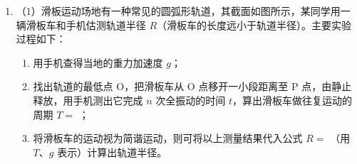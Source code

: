 \documentclass[\gkver]{gaokaozhenti}
\begin{document}
\begin{enumerate}
{B．根据右手定则可知，金属棒 a 第一次穿过磁场时回路中有逆时针方向的感应电流，故 B 正确；

C．电路中产生的平均电动势为 $\overline{E}=\frac{\Delta\Phi}{\Delta t}=\frac{BLd}{\Delta t}$，平均电流为 $\overline{I}=\frac{\overline{E}}{2R}$，金属棒 a 受到的安培力为 $\overline{F}=B\overline{I}d$。规定向右为正方向，对金属棒 a，根据动量定理得 $-B\overline{I}d\cdot\Delta t=m_{a}v_{a}-m_{a}v_{0}$，解得金属棒第一次离开磁场时速度 $v_{a}=1.5\Ums$。金属棒 a 第一次穿过磁场区域的过程中，电路中产生的总热量等于金属棒 a 机械能的减少量，即 $Q=\frac{1}{2}m_{a}v_{0}^{2}-\frac{1}{2}m_{a}v_{a}^{2}$，联立并代入数据得 $Q=0.6875\UJ$。由于两棒电阻相同，两棒产生的焦耳热相同，则金属棒 b 上产生的焦耳热 $Q_{b}=\frac{Q}{2}=0.34375\UJ$，故 C 错误；

D．规定向右为正方向，两金属棒碰撞过程根据动量守恒和机械能守恒得 $m_{a}v_{a}=m_{a}v_{a}'+m_{b}v_{b}$，$\frac{1}{2}m_{a}v_{a}^{2}=\frac{1}{2}m_{a}v_{a}'^{2}+\frac{1}{2}m_{b}v_{b}^{2}$，联立并代入数据解得金属棒 a 反弹的速度为 $v_{a}'=-0.5\Ums$。设金属棒 a 最终停在距磁场左边界 $x$ 处，则从反弹进入磁场到停下来的过程，电路中产生的平均电动势为 $\overline{E}'=\frac{\Delta\Phi'}{\Delta t'}=\frac{B(L-x)d}{\Delta t'}$，平均电流为 $\overline{I}'=\frac{\overline{E}'}{2R}$，金属棒 a 受到的安培力为 $\overline{F}'=B\overline{I}'d$，规定向右为正方向，对金属棒 a，根据动量定理得 $B\overline{I}'d\cdot\Delta t=0-m_{a}v_{a}'$，联立并代入数据解得 $x=0.8\Um$，故 D 正确。

故选 BD。
}

\item
（1）滑板运动场地有一种常见的圆弧形轨道，其截面如图所示，某同学用一辆滑板车和手机估测轨道半径 $R$（滑板车的长度远小于轨道半径）。主要实验过程如下：
\begin{enumerate}
	\item
	用手机查得当地的重力加速度 $g$；
	\item
	找出轨道的最低点 O，把滑板车从 O 点移开一小段距离至 P 点，由静止释放，用手机测出它完成 $n$ 次全振动的时间 $t$，算出滑板车做往复运动的周期 $T=$ ；
	\item
	将滑板车的运动视为简谐运动，则可将以上测量结果代入公式 $R=$ （用 $T$、$g$ 表示）计算出轨道半径。
\end{enumerate}



\end{enumerate}
\end{document}
